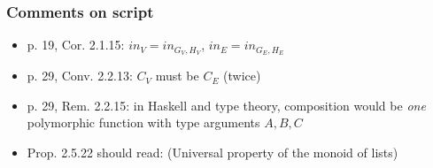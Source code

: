 \documentclass[handout]{beamer}
\begin{document}
\frame
  {   
    \frametitle{Comments on script}\label{Ch2:comments}

 \begin{itemize}[<+->]
\item p. 19, Cor. 2.1.15: $in_V = in_{G_V,H_V}$, $in_E = in_{G_E,H_E}$
\item p. 29, Conv. 2.2.13: $C_V$ must be $C_E$ (twice)
\item p. 29, Rem. 2.2.15: in Haskell and type theory, composition would be
\emph{one} polymorphic function with type arguments $A,B,C$
\item Prop. 2.5.22 should read: (Universal property of the monoid of lists) 
 \end{itemize}

 }
\end{document}
